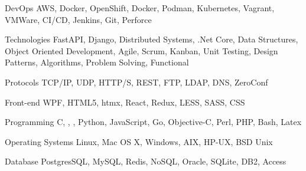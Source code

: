 

\begin{cvskills}

  \cvskill
    {DevOps} %
    {AWS, Docker, OpenShift, Docker, Podman, Kubernetes, Vagrant, VMWare, CI/CD, Jenkins, Git, Perforce} %

  \cvskill
    {Technologies} %
    {FastAPI, Django, Distributed Systems, .Net Core, Data Structures, Object Oriented Development, Agile, Scrum, Kanban, Unit Testing, Design Patterns, Algorithms, Problem Solving, Functional} %

  \cvskill
	{Protocols} %
	{TCP/IP, UDP, HTTP/S, REST, FTP, LDAP, DNS, ZeroConf } %

  \cvskill
    {Front-end} %
    {WPF, HTML5, htmx, React, Redux, LESS, SASS, CSS} %

  \cvskill
    {Programming} %
    {C, \Cpp, \Csh, Python, JavaScript, Go, Objective-C, Perl, PHP, Bash, Latex} %

  \cvskill
    {Operating Systems} %
    {Linux, Mac OS X, Windows, AIX, HP-UX, BSD Unix} %

  \cvskill
	{Database} %
	{PostgresSQL, MySQL, Redis, NoSQL, Oracle, SQLite, DB2, Access} %

\end{cvskills}


